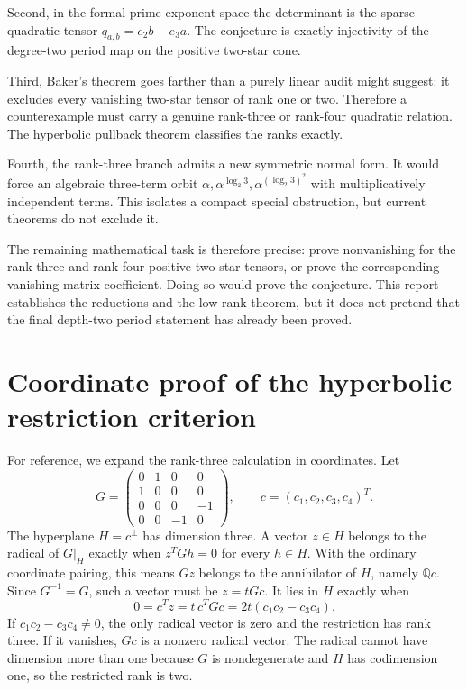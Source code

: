 \documentclass[11pt]{article}
\theoremstyle{definition}
\theoremstyle{remark}
\newcommand{\Q}{\mathbb{Q}}
\begin{document}
Second, in the formal prime-exponent space the determinant is the sparse quadratic tensor
$q_{a,b}=e_2b-e_3a$.  The conjecture is exactly injectivity of the degree-two period map on
the positive two-star cone.

Third, Baker's theorem goes farther than a purely linear audit might suggest: it excludes
every vanishing two-star tensor of rank one or two.  Therefore a counterexample must carry a
genuine rank-three or rank-four quadratic relation.  The hyperbolic pullback theorem
classifies the ranks exactly.

Fourth, the rank-three branch admits a new symmetric normal form.  It would force an
algebraic three-term orbit
$\alpha,\alpha^{\log_2 3},\alpha^{(\log_2 3)^2}$ with multiplicatively independent terms.
This isolates a compact special obstruction, but current theorems do not exclude it.

The remaining mathematical task is therefore precise: prove nonvanishing for the rank-three
and rank-four positive two-star tensors, or prove the corresponding vanishing matrix
coefficient.  Doing so would prove the conjecture.  This report establishes the reductions
and the low-rank theorem, but it does not pretend that the final depth-two period statement
has already been proved.

\appendix

\section{Coordinate proof of the hyperbolic restriction criterion}
\label{app:hyperbolic}

For reference, we expand the rank-three calculation in coordinates.  Let
\[
 G=\begin{pmatrix}
 0&1&0&0\\1&0&0&0\\0&0&0&-1\\0&0&-1&0
 \end{pmatrix},
 \qquad c=(c_1,c_2,c_3,c_4)^T.
\]
The hyperplane $H=c^\perp$ has dimension three.  A vector $z\in H$ belongs to the radical of
$G|_H$ exactly when $z^TGh=0$ for every $h\in H$.  With the ordinary coordinate pairing,
this means $Gz$ belongs to the annihilator of $H$, namely $\Q c$.  Since $G^{-1}=G$, such a
vector must be $z=tGc$.  It lies in $H$ exactly when
\[
 0=c^Tz=t\,c^TGc
 =2t(c_1c_2-c_3c_4).
\]
If $c_1c_2-c_3c_4\ne0$, the only radical vector is zero and the restriction has rank three.
If it vanishes, $Gc$ is a nonzero radical vector.  The radical cannot have dimension more
than one because $G$ is nondegenerate and $H$ has codimension one, so the restricted rank is
two.
\end{document}
